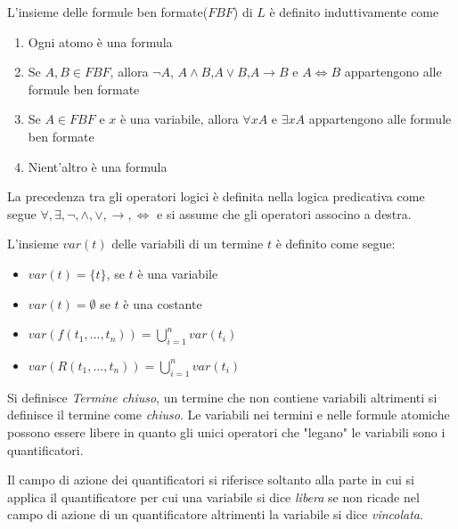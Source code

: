 \begin{defi}
    L'insieme delle formule ben formate($FBF$) di $L$ è definito induttivamente come
    \begin{enumerate}
        \item Ogni atomo è una formula
        \item Se $A,B \in FBF$, allora $\neg A$, $A \land B$,$A \lor B$,$A \rightarrow B$
              e $A \iff B$ appartengono alle formule ben formate
        \item Se $A \in FBF$ e $x$ è una variabile, allora $\forall x A$ e $\exists x A$
              appartengono alle formule ben formate
        \item Nient'altro è una formula
    \end{enumerate}
\end{defi}


La precedenza tra gli operatori logici è definita nella logica predicativa come segue
$\forall,\exists,\neg,\land,\lor,\rightarrow,\iff$ e si assume che gli operatori associno a destra.


\begin{defi}
    L'insieme $var(t)$ delle variabili di un termine $t$ è definito come segue:
    \begin{itemize}
        \item $var(t) = \{t \}$, se $t$ è una variabile
        \item $var(t) = \emptyset$ se $t$ è una costante
        \item $var(f(t_1,\dots,t_n)) = \bigcup _{i = 1} ^n var(t_i)$
        \item $var(R(t_1,\dots,t_n)) = \bigcup _{i = 1} ^ n var(t_i)$
    \end{itemize}
\end{defi}

Si definisce \emph{Termine chiuso}, un termine che non contiene variabili altrimenti
si definisce il termine come \emph{chiuso}.\newline
Le variabili nei termini e nelle formule atomiche possono essere libere
 in quanto gli unici operatori che "legano" le variabili sono i quantificatori.

Il campo di azione dei quantificatori si riferisce soltanto alla parte in cui
si applica il quantificatore per cui una variabile si dice \emph{libera}
se non ricade nel campo di azione di un quantificatore altrimenti la variabile si dice \emph{vincolata}.
